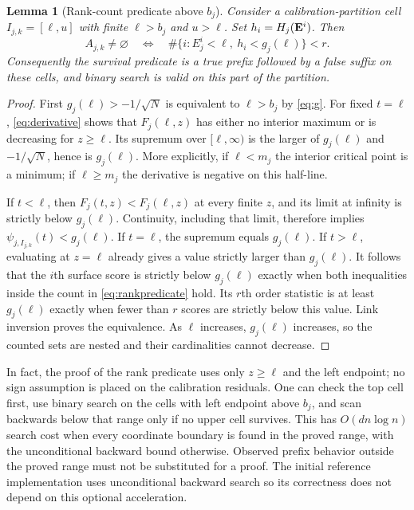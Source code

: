 \documentclass[11pt]{article}
\newtheorem{lemma}[theorem]{Lemma}
\begin{document}
\begin{lemma}[Rank-count predicate above $b_j$]\label{lem:binary}
Consider a calibration-partition cell $I_{j,k}=[\ell,u]$ with finite
$\ell>b_j$ and $u>\ell$. Set $h_i=H_j(\mathbf E^i)$. Then
\begin{equation}\label{eq:rankpredicate}
 A_{j,k}\ne\varnothing\quad\Longleftrightarrow\quad
 \#\{i:E^i_j<\ell,\ h_i<g_j(\ell)\}<r.
\end{equation}
Consequently the survival predicate is a true prefix followed by a false suffix
on these cells, and binary search is valid on this part of the partition.
\end{lemma}
\begin{proof}
First $g_j(\ell)>-1/\sqrt N$ is equivalent to $\ell>b_j$ by
\eqref{eq:g}. For fixed $t=\ell$, \eqref{eq:derivative} shows that
$F_j(\ell,z)$ has either no interior maximum or is decreasing for $z\ge\ell$.
Its supremum over $[\ell,\infty)$ is the larger of $g_j(\ell)$ and
$-1/\sqrt N$, hence is $g_j(\ell)$. More explicitly, if $\ell<m_j$ the
interior critical point is a minimum; if $\ell\ge m_j$ the derivative is
negative on this half-line.

If $t<\ell$, then $F_j(t,z)<F_j(\ell,z)$ at every finite $z$, and its limit
at infinity is strictly below $g_j(\ell)$. Continuity, including that limit,
therefore implies $\psi_{j,I_{j,k}}(t)<g_j(\ell)$. If $t=\ell$, the supremum
equals $g_j(\ell)$. If $t>\ell$, evaluating at $z=\ell$ already gives a value
strictly larger than $g_j(\ell)$. It follows that the $i$th surface score is
strictly below $g_j(\ell)$ exactly when both inequalities inside the count in
\eqref{eq:rankpredicate} hold. Its $r$th order statistic is at least
$g_j(\ell)$ exactly when fewer than $r$ scores are strictly below this value.
Link inversion proves the equivalence. As $\ell$ increases, $g_j(\ell)$
increases, so the counted sets are nested and their cardinalities cannot decrease.
\end{proof}
In fact, the proof of the rank predicate uses only $z\ge\ell$ and the left
endpoint; no sign assumption is placed on the calibration residuals.
One can check the top cell first, use binary search on the cells with left
endpoint above $b_j$, and scan backwards below that range only if no upper
cell survives. This has $O(dn\log n)$ search cost when every coordinate boundary
is found in the proved range, with the unconditional backward bound otherwise.
Observed prefix behavior outside the proved range must not be substituted for
a proof. The initial reference implementation uses unconditional backward search
so its correctness does not depend on this optional acceleration.
\end{document}
